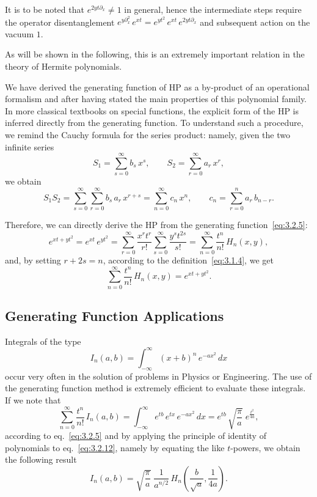  It is to be noted that
$e^{2yt\partial_x}\neq 1$ in general, hence the intermediate steps
require the operator disentanglement
$e^{y\partial_x^2}\,e^{xt}=e^{yt^2}\,e^{xt}\,e^{2yt\partial_x}$ and
subsequent action on the vacuum $1$.

\medskip
As will be shown in the following, this is an extremely important
relation in the theory of Hermite polynomials.

We have derived the generating function of HP as a by-product of an
operational formalism and after having stated the main properties of
this polynomial family. In more classical textbooks on special
functions, the explicit form of the HP is inferred directly from the
generating function. To understand such a procedure, we remind the
Cauchy formula for the series product: namely, given the two infinite
series
\[
S_1=\sum_{s=0}^{\infty}b_s\,x^s,\qquad
S_2=\sum_{r=0}^{\infty}a_r\,x^r,
\]
we obtain
\[
S_1S_2=\sum_{s=0}^{\infty}\sum_{r=0}^{\infty}b_s\,a_r\,x^{r+s}
=\sum_{n=0}^{\infty}c_n\,x^n,\qquad
c_n=\sum_{r=0}^{n}a_r\,b_{n-r}.
\]

Therefore, we can directly derive the HP from the generating
function~\eqref{eq:3.2.5}:
\[
e^{xt+yt^2}=e^{xt}\,e^{yt^2}
=\sum_{r=0}^{\infty}\frac{x^r t^r}{r!}
 \sum_{s=0}^{\infty}\frac{y^s t^{2s}}{s!}
=\sum_{n=0}^{\infty}\frac{t^n}{n!}\,H_n(x,y),
\]
and, by setting $r+2s=n$, according to the
definition~\eqref{eq:3.1.4}, we get
\[
\sum_{n=0}^{\infty}\frac{t^n}{n!}\,H_n(x,y)
=e^{xt+yt^2}.
\]

\subsection{Generating Function Applications}
\label{sec:3.2.2}

Integrals of the type
\begin{equation}
I_n(a,b)=\int_{-\infty}^{\infty}(x+b)^n\,e^{-ax^2}\,dx
\label{eq:3.2.11}
\end{equation}
occur very often in the solution of problems in Physics or
Engineering. The use of the generating function method is extremely
efficient to evaluate these integrals. If we note that
\[
\sum_{n=0}^{\infty}\frac{t^n}{n!}\,I_n(a,b)
=\int_{-\infty}^{\infty}e^{tb}\,e^{tx}\,e^{-ax^2}\,dx
=e^{tb}\,\sqrt{\frac{\pi}{a}}\;e^{\frac{t^2}{4a}},
\label{eq:3.2.12}
\]
according to eq.~\eqref{eq:3.2.5} and by applying the principle of
identity of polynomials to eq.~\eqref{eq:3.2.12}, namely by equating
the like $t$-powers, we obtain the following result
\begin{equation}
I_n(a,b)=\sqrt{\frac{\pi}{a}}\;\frac{1}{a^{n/2}}\,
H_n\!\left(\frac{b}{\sqrt{a}},\frac{1}{4a}\right).
\label{eq:3.2.13}
\end{equation}

